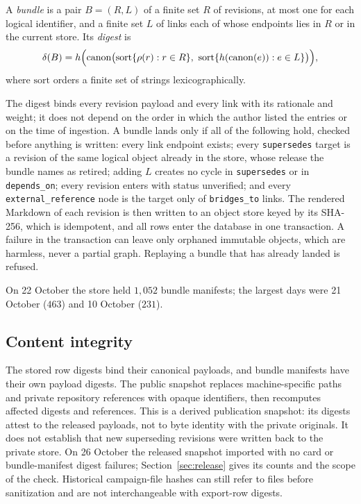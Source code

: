 \begin{definition}[Bundle]\label{def:bundle}
A \emph{bundle} is a pair $B=(R,L)$ of a finite set $R$ of revisions, at most one for each logical identifier, and a finite set $L$ of links each of whose endpoints lies in $R$ or in the current store. Its \emph{digest} is
\[
\delta(B)=h\Bigl(\mathrm{canon}\bigl(\mathrm{sort}\{\rho(r):r\in R\},\ \mathrm{sort}\{h(\mathrm{canon}(e)):e\in L\}\bigr)\Bigr),
\]
where $\mathrm{sort}$ orders a finite set of strings lexicographically.
\end{definition}

The digest binds every revision payload and every link with its rationale and weight; it does not depend on the order in which the author listed the entries or on the time of ingestion. A bundle lands only if all of the following hold, checked before anything is written: every link endpoint exists; every \texttt{supersedes} target is a revision of the same logical object already in the store, whose release the bundle names as retired; adding $L$ creates no cycle in \texttt{supersedes} or in \texttt{depends\_on}; every revision enters with status \textsf{unverified}; and every \texttt{external\_reference} node is the target only of \texttt{bridges\_to} links. The rendered Markdown of each revision is then written to an object store keyed by its SHA-256, which is idempotent, and all rows enter the database in one transaction. A failure in the transaction can leave only orphaned immutable objects, which are harmless, never a partial graph. Replaying a bundle that has already landed is refused.

On 22 October the store held $1{,}052$ bundle manifests; the largest days were 21 October ($463$) and 10 October ($231$).

\subsection{Content integrity}

The stored row digests bind their canonical payloads, and bundle manifests have their own payload digests. The public snapshot replaces machine-specific paths and private repository references with opaque identifiers, then recomputes affected digests and references. This is a derived publication snapshot: its digests attest to the released payloads, not to byte identity with the private originals. It does not establish that new superseding revisions were written back to the private store. On 26 October the released snapshot imported with no card or bundle-manifest digest failures; Section~\ref{sec:release} gives its counts and the scope of the check. Historical campaign-file hashes can still refer to files before sanitization and are not interchangeable with export-row digests.


